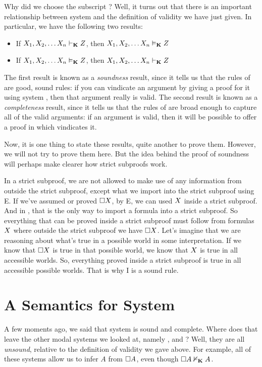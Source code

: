 Why did we choose the subscript \mlK? Well, it turns out that there is an important relationship between system \mlK{} and the definition of validity we have just given. In particular, we have the following two results:
\begin{itemize}
	\item If $X_1,X_2, \dots X_n\vdash_{\mathbf{K}}Z$, then $X_1,X_2, \dots X_n\vDash_{\mathbf{K}}Z$
	\item If $X_1,X_2, \dots X_n\vDash_{\mathbf{K}}Z$, then $X_1,X_2, \dots X_n\vdash_{\mathbf{K}}Z$
\end{itemize}
The first result is known as a \emph{soundness} result, since it tells us that the rules of \mlK{} are good, sound rules: if you can vindicate an argument by giving a proof for it using system \mlK, then that argument really is valid. The second result is known as a \emph{completeness} result, since it tells us that the rules of \mlK{} are broad enough to capture all of the valid arguments: if an argument is valid, then it will be possible to offer a proof in \mlK{} which vindicates it.

Now, it is one thing to state these results, quite another to prove them. However, we will not try to prove them here. But the idea behind the proof of soundness will perhaps make clearer how strict subproofs work.

In a strict subproof, we are not allowed to make use of any information from outside the strict subproof, except what we import into the strict subproof using \ebox E. If we've assumed or proved $\Box X$, by \ebox E, we can used $X$ inside a strict subproof. And in \mlK, that is the only way to import a formula into a strict subproof. So everything that can be proved inside a strict subproof must follow from formulas $X$ where outside the strict subproof we have $\Box X$. Let's imagine that we are reasoning about what's true in a possible world in some interpretation. If we know that $\Box X$ is true in that possible world, we know that $X$ is true in all accessible worlds. So, everything proved inside a strict subproof is true in all accessible possible worlds. That is why \ebox I is a sound rule.

\section{A Semantics for System \mlT}
\label{SemanticsT}

A few moments ago, we said that system \mlK{} is sound and complete. Where does that leave the other modal systems we looked at, namely  \mlT, \mlSfour{} and \mlSfive? Well, they are all \emph{unsound}, relative to the definition of validity we gave above. For example, all of these systems allow us to infer $A$ from $\Box A$, even though $\Box A\nvDash_{\mathbf{K}} A$.

